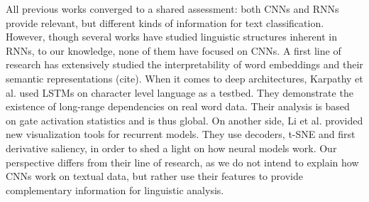 
 All previous works converged to a shared assessment: both CNNs and RNNs provide relevant, but different kinds of information for text classification. 
 However, though several works have studied linguistic structures inherent in RNNs, to our knowledge, none of them have focused on CNNs. 
 A first line of research has extensively studied the interpretability of word embeddings and their semantic representations (cite). 
 When it comes to deep architectures, Karpathy et al. \cite{karpathy2015visualizing} used LSTMs on character level language as a testbed. They demonstrate the existence of 
 long-range dependencies on real word data. Their analysis is based on gate activation statistics and is thus global. On another side, Li et al. \cite{li2015visualizing}
 provided new visualization tools for recurrent models. They use decoders, t-SNE and first derivative saliency, in order to shed a light on how neural models work.
Our perspective differs from their line of research, as we do not intend to explain how CNNs work on textual data, but rather use their features 
to provide complementary information for linguistic analysis.

